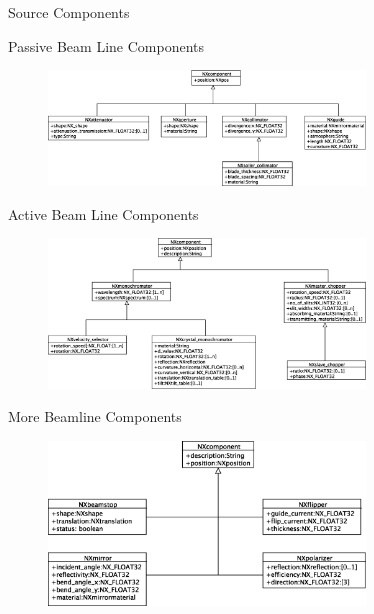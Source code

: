 \documentclass[final,nototal,pdf,mark]{prosper}
\begin{document}
\begin{slide}{Source Components }
\begin{center}
\end{center}

\end{slide}\begin{slide}{Passive Beam Line Components }
\begin{center}
\begin{figure}
\includegraphics[width=0.75\textwidth]{nxpassivebeam.eps}\end{figure}



\end{center}

\end{slide}\begin{slide}{Active Beam Line Components }
\begin{center}
\begin{figure}
\includegraphics[width=0.75\textwidth]{nxactivebeam.eps}\end{figure}



\end{center}
\end{slide}\begin{slide}{More Beamline Components }
\begin{center}
\begin{figure}
\includegraphics[width=0.75\textwidth]{nxmorebeam.eps}\end{figure}




\end{center}
\end{slide}
\end{document}
